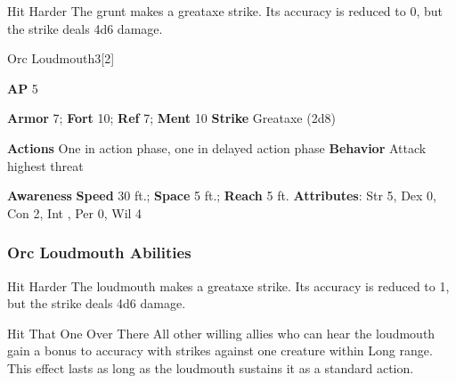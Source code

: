 \begin{ability}{Hit Harder}
The grunt makes a greataxe strike.
Its accuracy is reduced to 0, but the strike deals 4d6 damage.
\end{ability}






\begin{monsection}{Orc Loudmouth}{3}[2]
\vspace{-1em}\vspace{-1em}
\begin{spellcontent}
\begin{spelltargetinginfo}
{\textbf{AP} 5}

\pari \textbf{Armor} 7;
\textbf{Fort} 10;
\textbf{Ref} 7;
\textbf{Ment} 10
\pari \textbf{Strike} Greataxe  (2d8)


\pari \textbf{Actions} One in action phase, one in delayed action phase
\pari \textbf{Behavior} Attack highest threat
\end{spelltargetinginfo}
\end{spellcontent}

\begin{monsterfooter}
\pari \textbf{Awareness} 
\pari \textbf{Speed} 30 ft.;
\textbf{Space} 5 ft.;
\textbf{Reach} 5 ft.
\pari \textbf{Attributes}:
Str 5,
Dex 0,
Con 2,
Int ,
Per 0,
Wil 4
\end{monsterfooter}
\end{monsection}


\subsubsection{Orc Loudmouth Abilities}

\begin{ability}{Hit Harder}
The loudmouth makes a greataxe strike.
Its accuracy is reduced to 1, but the strike deals 4d6 damage.
\end{ability}

\vspace{0.5em}
\begin{ability}{Hit That One Over There}
All other willing allies who can hear the loudmouth gain a  bonus to accuracy with strikes against one creature within Long range.
This effect lasts as long as the loudmouth sustains it as a standard action.
\end{ability}







